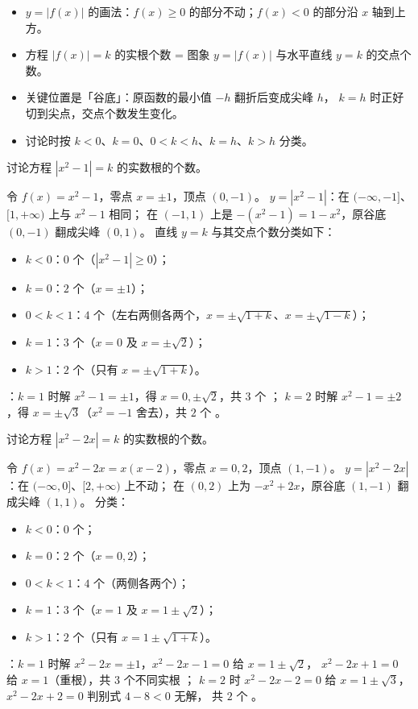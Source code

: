 \begin{explore}
\begin{itemize}
  \item $y=|f(x)|$ 的画法：$f(x)\geq0$ 的部分不动；$f(x)<0$ 的部分沿 $x$ 轴到上方。
  \item 方程 $|f(x)|=k$ 的实根个数 = 图象 $y=|f(x)|$ 与水平直线 $y=k$ 的交点个数。
  \item 关键位置是「谷底」：原函数的最小值 $-h$ 翻折后变成尖峰 $h$，
        $k=h$ 时正好切到尖点，交点个数发生变化。
  \item 讨论时按 $k<0$、$k=0$、$0<k<h$、$k=h$、$k>h$ 分类。
\end{itemize}

\begin{example}
讨论方程 $|x^2-1|=k$ 的实数根的个数。
\end{example}
\begin{solution}
令 $f(x)=x^2-1$，零点 $x=\pm1$，顶点 $(0,-1)$。
$y=|x^2-1|$：在 $(-\infty,-1]$、$[1,+\infty)$ 上与 $x^2-1$ 相同；
在 $(-1,1)$ 上是 $-(x^2-1)=1-x^2$，原谷底 $(0,-1)$ 翻成尖峰 $(0,1)$。
直线 $y=k$ 与其交点个数分类如下：
\begin{itemize}
  \item $k<0$：$0$ 个（$|x^2-1|\geq0$）；
  \item $k=0$：$2$ 个（$x=\pm1$）；
  \item $0<k<1$：$4$ 个（左右两侧各两个，$x=\pm\sqrt{1+k}$、$x=\pm\sqrt{1-k}$）；
  \item $k=1$：$3$ 个（$x=0$ 及 $x=\pm\sqrt2$）；
  \item $k>1$：$2$ 个（只有 $x=\pm\sqrt{1+k}$）。
\end{itemize}
：$k=1$ 时解 $x^2-1=\pm1$，得 $x=0,\pm\sqrt2$，共 $3$ 个 \checkmark；
$k=2$ 时解 $x^2-1=\pm2$，得 $x=\pm\sqrt3$（$x^2=-1$ 舍去），共 $2$ 个 \checkmark。
\end{solution}

\begin{problem}
讨论方程 $|x^2-2x|=k$ 的实数根的个数。
\end{problem}
\begin{solution}
令 $f(x)=x^2-2x=x(x-2)$，零点 $x=0,2$，顶点 $(1,-1)$。
$y=|x^2-2x|$：在 $(-\infty,0]$、$[2,+\infty)$ 上不动；
在 $(0,2)$ 上为 $-x^2+2x$，原谷底 $(1,-1)$ 翻成尖峰 $(1,1)$。
分类：
\begin{itemize}
  \item $k<0$：$0$ 个；
  \item $k=0$：$2$ 个（$x=0,2$）；
  \item $0<k<1$：$4$ 个（两侧各两个）；
  \item $k=1$：$3$ 个（$x=1$ 及 $x=1\pm\sqrt2$）；
  \item $k>1$：$2$ 个（只有 $x=1\pm\sqrt{1+k}$）。
\end{itemize}
：$k=1$ 时解 $x^2-2x=\pm1$，$x^2-2x-1=0$ 给 $x=1\pm\sqrt2$，
$x^2-2x+1=0$ 给 $x=1$（重根），共 $3$ 个不同实根 \checkmark；
$k=2$ 时 $x^2-2x-2=0$ 给 $x=1\pm\sqrt3$，$x^2-2x+2=0$ 判别式 $4-8<0$ 无解，
共 $2$ 个 \checkmark。
\end{solution}


\end{explore}
